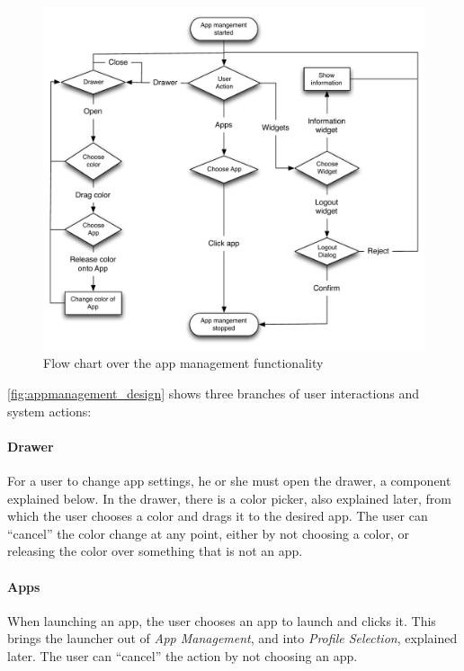 \begin{figure}[!h]
	\centering
	\includegraphics[width=1\textwidth]{gfx/appmanagement.pdf}
	\caption{Flow chart over the app management functionality}
	\label{fig:appmanagement_design}
\end{figure}

\autoref{fig:appmanagement_design} shows three branches of user interactions and system actions:


\paragraph{Drawer} For a user to change app settings, he or she must open the drawer, a component explained below. 
In the drawer, there is a color picker, also explained later, from which the user chooses a color and drags it to the desired app. 
The user can ``cancel'' the color change at any point, either by not choosing a color, or releasing the color over something that is not an app. 

\paragraph{Apps} When launching an app, the user chooses an app to launch and clicks it. 
This brings the launcher out of \emph{App Management}, and into \emph{Profile Selection}, explained later. 
The user can ``cancel'' the action by not choosing an app.%

